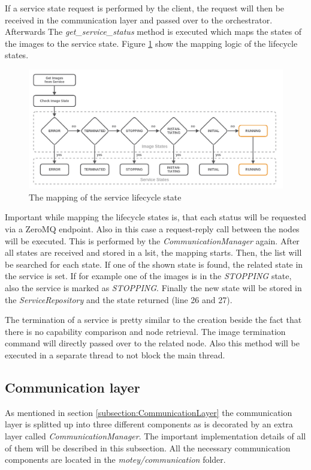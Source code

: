 If a service state request is performed by the client, the request will then be received in the communication layer and passed over to the orchestrator.
Afterwards The \textit{get\_service\_status} method is executed which maps the states of the images to the service state.
Figure \ref{fig:lifecycle_mapping} show the mapping logic of the lifecycle states.

\begin{figure}[H]
    \centering
    \includegraphics[width=\textwidth]{resources/images/lifecycle_state.png}
    \caption[The mapping of the service lifecycle state]{The mapping of the service lifecycle state}
    \label{fig:lifecycle_mapping}
\end{figure}

Important while mapping the lifecycle states is, that each status will be requested via a ZeroMQ endpoint.
Also in this case a request-reply call between the nodes will be executed.
This is performed by the \textit{CommunicationManager} again.
After all states are received and stored in a lsit, the mapping starts.
Then, the list will be searched for each state.
If one of the shown state is found, the related state in the service is set.
If for example one of the images is in the \textit{STOPPING} state, also the service is marked as \textit{STOPPING}.
Finally the new state will be stored in the \textit{ServiceRepository} and the state returned (line 26 and 27).\newline

The termination of a service is pretty similar to the creation beside the fact that there is no capability comparison and node retrieval.
The image termination command will directly passed over to the related node.
Also this method will be executed in a separate thread to not block the main thread.

\subsection{Communication layer}
\label{subsection:implementation-communication-layer}
As mentioned in section \ref{subsection:CommunicationLayer} the communication layer is splitted up into three different components as is decorated by an extra layer called \textit{CommunicationManager}.
The important implementation details of all of them will be described in this subsection.
All the necessary communication components are located in the \textit{motey/communication} folder.

